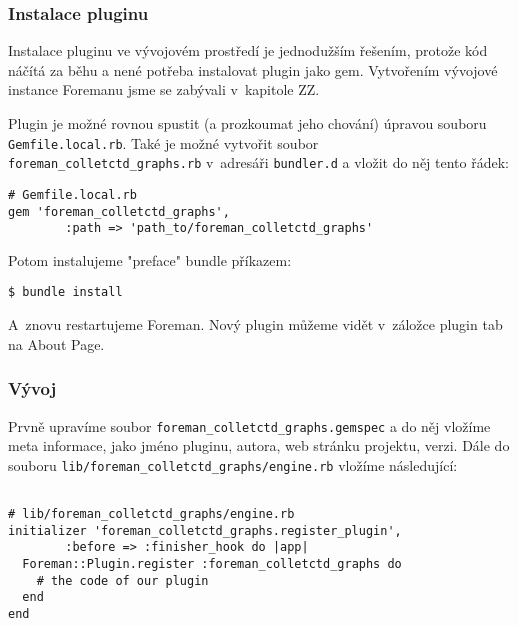 \subsubsection{Instalace pluginu}

Instalace pluginu ve vývojovém prostředí je jednodužším řešením, protože kód náčítá za běhu a nené potřeba instalovat plugin jako gem. Vytvořením vývojové instance Foremanu jsme se zabývali v~kapitole ZZ.

Plugin je možné rovnou spustit (a prozkoumat jeho chování) úpravou souboru \texttt{Gemfile.local.rb}. Také je možné vytvořit soubor \\\texttt{foreman_colletctd_graphs.rb} v~adresáři \texttt{bundler.d} a vložit do něj tento řádek:

\begin{verbatim}
# Gemfile.local.rb
gem 'foreman_colletctd_graphs',
 		:path => 'path_to/foreman_colletctd_graphs'
\end{verbatim}

Potom instalujeme "preface" bundle příkazem:
\begin{verbatim}
$ bundle install
\end{verbatim}

A~znovu restartujeme Foreman. Nový plugin můžeme vidět v~záložce plugin tab na About Page.

\subsubsection{Vývoj}

Prvně upravíme soubor \texttt{foreman_colletctd_graphs.gemspec} a do něj vložíme meta informace, jako jméno pluginu, autora, web stránku projektu, verzi. Dále do souboru \texttt{lib/foreman_colletctd_graphs/engine.rb} vložíme následující:

\begin{verbatim}

# lib/foreman_colletctd_graphs/engine.rb
initializer 'foreman_colletctd_graphs.register_plugin',
 		:before => :finisher_hook do |app|
  Foreman::Plugin.register :foreman_colletctd_graphs do
    # the code of our plugin
  end
end
\end{verbatim}



%
